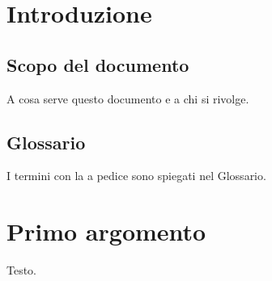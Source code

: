 \section{Introduzione}

\subsection{Scopo del documento}
A cosa serve questo documento e a chi si rivolge.

\subsection{Glossario}
I termini con la  a pedice sono spiegati nel Glossario.

\section{Primo argomento}
Testo.

% 


